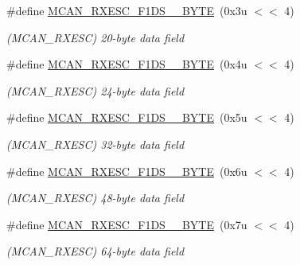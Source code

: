 \begin{DoxyCompactItemize}
\#define \mbox{\hyperlink{group__SAMV71__MCAN_gae65f44ba4bcad71c503ffcbdee1f4166}{M\+C\+A\+N\+\_\+\+R\+X\+E\+S\+C\+\_\+\+F1\+D\+S\+\_\+\_\+\+B\+Y\+TE}}~(0x3u $<$$<$ 4)
\begin{DoxyCompactList}\small\item\em (M\+C\+A\+N\+\_\+\+R\+X\+E\+SC) 20-\/byte data field \end{DoxyCompactList}\item 
\mbox{\label{group__SAMV71__MCAN_gae056f130e96006ee21a0041f179b7c80}} 
\#define \mbox{\hyperlink{group__SAMV71__MCAN_gae056f130e96006ee21a0041f179b7c80}{M\+C\+A\+N\+\_\+\+R\+X\+E\+S\+C\+\_\+\+F1\+D\+S\+\_\+\_\+\+B\+Y\+TE}}~(0x4u $<$$<$ 4)
\begin{DoxyCompactList}\small\item\em (M\+C\+A\+N\+\_\+\+R\+X\+E\+SC) 24-\/byte data field \end{DoxyCompactList}\item 
\mbox{\label{group__SAMV71__MCAN_gaf622995c4088792945dd20bccb974fd6}} 
\#define \mbox{\hyperlink{group__SAMV71__MCAN_gaf622995c4088792945dd20bccb974fd6}{M\+C\+A\+N\+\_\+\+R\+X\+E\+S\+C\+\_\+\+F1\+D\+S\+\_\+\_\+\+B\+Y\+TE}}~(0x5u $<$$<$ 4)
\begin{DoxyCompactList}\small\item\em (M\+C\+A\+N\+\_\+\+R\+X\+E\+SC) 32-\/byte data field \end{DoxyCompactList}\item 
\mbox{\label{group__SAMV71__MCAN_ga616d23bbeb5655290510c1fc70da1a2b}} 
\#define \mbox{\hyperlink{group__SAMV71__MCAN_ga616d23bbeb5655290510c1fc70da1a2b}{M\+C\+A\+N\+\_\+\+R\+X\+E\+S\+C\+\_\+\+F1\+D\+S\+\_\+\_\+\+B\+Y\+TE}}~(0x6u $<$$<$ 4)
\begin{DoxyCompactList}\small\item\em (M\+C\+A\+N\+\_\+\+R\+X\+E\+SC) 48-\/byte data field \end{DoxyCompactList}\item 
\mbox{\label{group__SAMV71__MCAN_ga7c94a95637b3dfb6c639540cb76da614}} 
\#define \mbox{\hyperlink{group__SAMV71__MCAN_ga7c94a95637b3dfb6c639540cb76da614}{M\+C\+A\+N\+\_\+\+R\+X\+E\+S\+C\+\_\+\+F1\+D\+S\+\_\+\_\+\+B\+Y\+TE}}~(0x7u $<$$<$ 4)
\begin{DoxyCompactList}\small\item\em (M\+C\+A\+N\+\_\+\+R\+X\+E\+SC) 64-\/byte data field \end{DoxyCompactList}\item 
$$
\end{DoxyCompactItemize}
